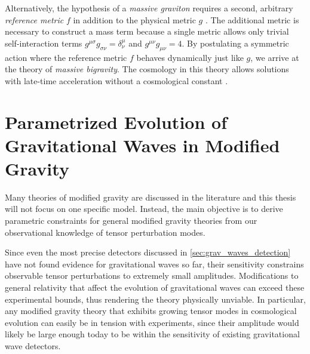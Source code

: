 Alternatively, the hypothesis of a \emph{massive graviton} requires a second, arbitrary \emph{reference metric} \(f\) in addition to the physical metric \(g\) \autocite{deRham2014}. The additional metric is necessary to construct a mass term because a single metric allows only trivial self-interaction terms \(g^{\mu\sigma}g_{\sigma\nu}=\delta^\mu_\nu\) and \(g^{\mu\nu}g_{\mu\nu} = 4\). By postulating a symmetric action where the reference metric \(f\) behaves dynamically just like \(g\), we arrive at the theory of \emph{massive bigravity}.
The cosmology in this theory allows solutions with late-time acceleration without a cosmological constant \autocite{Akrami2013,Konnig2014}.



\chapter{Parametrized Evolution of Gravitational Waves in Modified Gravity}\label{ch:param_mod_grav}

Many theories of modified gravity are discussed in the literature \autocite{Clifton2012,Euclid2013,deRham2014} and this thesis will not focus on one specific model. Instead, the main objective is to derive parametric constraints for general modified gravity theories from our observational knowledge of tensor perturbation modes.

Since even the most precise detectors discussed in \autoref{sec:grav_waves_detection} have not found evidence for gravitational waves so far, their sensitivity constrains observable tensor perturbations to extremely small amplitudes. Modifications to general relativity that affect the evolution of gravitational waves can exceed these experimental bounds, thus rendering the theory physically unviable. In particular, any modified gravity theory that exhibits growing tensor modes in cosmological evolution can easily be in tension with experiments, since their amplitude would likely be large enough today to be within the sensitivity of existing gravitational wave detectors.

